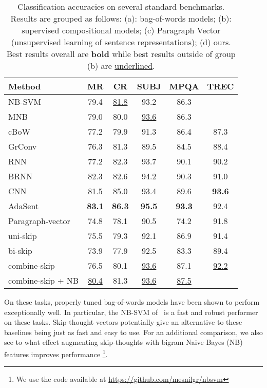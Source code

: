 \documentclass{article} \usepackage{nips15submit_e,times}
\begin{document}
\begin{wraptable}{l}{8cm}
\scriptsize
\centering
\begin{tabular}{lccccc}
\toprule \bf Method & \bf MR & \bf CR & \bf SUBJ & \bf MPQA & \bf TREC  \\ \midrule
NB-SVM \cite{wang2012baselines} & 79.4 & \underline{81.8} & 93.2 & 86.3 &  \\
MNB \cite{wang2012baselines} & 79.0 & 80.0 & \underline{93.6} & 86.3 &  \\
cBoW \cite{zhao2015self} & 77.2 & 79.9 & 91.3 & 86.4 & 87.3 \\ \midrule
GrConv \cite{zhao2015self} & 76.3 & 81.3 & 89.5 & 84.5 & 88.4 \\
RNN \cite{zhao2015self} & 77.2 & 82.3 & 93.7 & 90.1 & 90.2 \\
BRNN \cite{zhao2015self} & 82.3 & 82.6 & 94.2 & 90.3 & 91.0 \\
CNN \cite{kim2014convolutional} & 81.5 & 85.0 & 93.4 & 89.6 & {\bf 93.6} \\
AdaSent \cite{zhao2015self} & {\bf 83.1} & {\bf 86.3} & {\bf 95.5} & {\bf 93.3} & 92.4 \\ \midrule
Paragraph-vector \cite{le2014distributed} & 74.8 & 78.1 & 90.5 & 74.2 & 91.8 \\ \midrule
uni-skip   & 75.5 & 79.3 & 92.1 & 86.9 & 91.4 \\
bi-skip & 73.9 & 77.9 & 92.5 & 83.3 & 89.4 \\
combine-skip & 76.5 & 80.1 & \underline{93.6} & 87.1 & \underline{92.2} \\
combine-skip + NB & \underline{80.4} & 81.3 & \underline{93.6} & \underline{87.5} &  \\ \bottomrule
\end{tabular}
\caption{\small{Classification accuracies on several standard benchmarks. Results are grouped as follows: (a): bag-of-words models; (b): supervised compositional models; (c) Paragraph Vector (unsupervised learning of sentence representations); (d) ours. Best results overall are {\bf bold} while best results outside of group (b) are \underline{ underlined}.} }
\label{tab:classification}
\vspace{-5mm}
\end{wraptable}

On these tasks, properly tuned bag-of-words models have been shown to perform exceptionally well. In particular, the NB-SVM of~\cite{wang2012baselines} is a fast and robust performer on these tasks. Skip-thought vectors potentially give an alternative to these baselines being just as fast and easy to use. For an additional comparison, we also see to what effect augmenting skip-thoughts with bigram Naive Bayes (NB) features improves performance \footnote{We use the code available at \url{https://github.com/mesnilgr/nbsvm}}.
\end{document}
